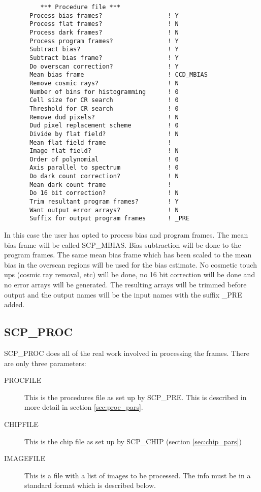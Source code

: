 \begin{verbatim}
          *** Procedure file ***
       Process bias frames?                  ! Y
       Process flat frames?                  ! N
       Process dark frames?                  ! N
       Process program frames?               ! Y
       Subtract bias?                        ! Y
       Subtract bias frame?                  ! Y
       Do overscan correction?               ! Y
       Mean bias frame                       ! CCD_MBIAS
       Remove cosmic rays?                   ! N
       Number of bins for histogramming      ! 0
       Cell size for CR search               ! 0
       Threshold for CR search               ! 0
       Remove dud pixels?                    ! N
       Dud pixel replacement scheme          ! 0
       Divide by flat field?                 ! N
       Mean flat field frame                 !
       Image flat field?                     ! N
       Order of polynomial                   ! 0
       Axis parallel to spectrum             ! 0
       Do dark count correction?             ! N
       Mean dark count frame                 !
       Do 16 bit correction?                 ! N
       Trim resultant program frames?        ! Y
       Want output error arrays?             ! N
       Suffix for output program frames      ! _PRE
\end{verbatim}

In this case the user has opted to process bias and program frames. The mean
bias frame will be called SCP\_MBIAS. Bias subtraction will be done to the
program frames.  The same mean bias frame which has been scaled to the mean
bias in the overscan regions will be used for the bias estimate.  No cosmetic
touch ups (cosmic ray removal, etc) will be done, no 16 bit correction will be
done and no error arrays will be generated.  The resulting arrays will be
trimmed before output and the output names will be the input names with the
suffix \_PRE added.

\subsection {SCP\_PROC} \label{sec:imfil}

SCP\_PROC does all of the real work involved in processing the frames.
There are only three parameters:

\begin{description}

\item [PROCFILE] This is the procedures file as set up by SCP\_PRE. This
is described in more detail in section \ref{sec:proc_pars}.

\item [CHIPFILE] This is the chip file as set up by SCP\_CHIP (section
\ref{sec:chip_pars})

\item [IMAGEFILE] This is a file with a list of images to be processed. The
info must be in a standard format which is described below.

\end{description}

